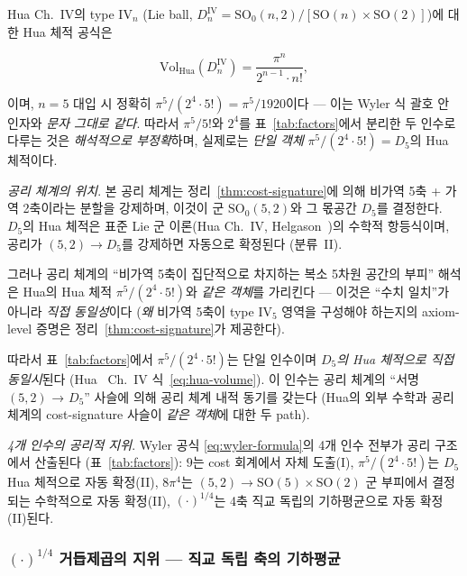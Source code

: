 \documentclass[entropy,article,submit,pdftex,oneauthor]{Definitions/mdpi}
\begin{document}
Hua Ch.~IV의 type IV$_n$ (Lie ball, $D_n^{\text{IV}} = \mathrm{SO}_0(n,2)/[\mathrm{SO}(n)\times\mathrm{SO}(2)]$)에 대한 Hua 체적 공식은
\begin{linenomath}
\begin{equation}
\mathrm{Vol}_{\text{Hua}}(D_n^{\text{IV}}) = \frac{\pi^n}{2^{n-1} \cdot n!},
\label{eq:hua-volume}
\end{equation}
\end{linenomath}
이며, $n=5$ 대입 시 정확히 $\pi^5/(2^4 \cdot 5!) = \pi^5/1920$이다 — 이는 Wyler 식 괄호 안 인자와 \emph{문자 그대로 같다}. 따라서 $\pi^5/5!$와 $2^4$를 표~\ref{tab:factors}에서 분리한 두 인수로 다루는 것은 \emph{해석적으로 부정확}하며, 실제로는 \emph{단일 객체} $\pi^5/(2^4 \cdot 5!) = D_5$의 Hua 체적이다.

\textit{공리 체계의 위치}. 본 공리 체계는 정리~\ref{thm:cost-signature}에 의해 비가역 5축 + 가역 2축이라는 분할을 강제하며, 이것이 군 $\mathrm{SO}_0(5,2)$와 그 몫공간 $D_5$를 결정한다. $D_5$의 Hua 체적은 표준 Lie 군 이론(Hua Ch.~IV, Helgason~\cite{helgason1978})의 수학적 항등식이며, 공리가 $(5,2) \to D_5$를 강제하면 자동으로 확정된다 (분류~II).

그러나 공리 체계의 ``비가역 5축이 집단적으로 차지하는 복소 5차원 공간의 부피'' 해석은 Hua의 Hua 체적 $\pi^5/(2^4 \cdot 5!)$와 \emph{같은 객체}를 가리킨다 — 이것은 ``수치 일치''가 아니라 \emph{직접 동일성}이다 (\emph{왜} 비가역 5축이 type IV$_5$ 영역을 구성해야 하는지의 axiom-level 증명은 정리~\ref{thm:cost-signature}가 제공한다).

따라서 표~\ref{tab:factors}에서 $\pi^5/(2^4 \cdot 5!)$는 단일 인수이며 \emph{$D_5$의 Hua 체적으로 직접 동일시}된다 (Hua~\cite{hua1963} Ch.~IV 식~\eqref{eq:hua-volume}). 이 인수는 공리 체계의 ``서명 $(5,2)$ → $D_5$'' 사슬에 의해 공리 체계 내적 동기를 갖는다 (Hua의 외부 수학과 공리 체계의 cost-signature 사슬이 \emph{같은 객체}에 대한 두 path).

\textit{4개 인수의 공리적 지위}. Wyler 공식 \eqref{eq:wyler-formula}의 4개 인수 전부가 공리 구조에서 산출된다 (표~\ref{tab:factors}): $9$는 cost 회계에서 자체 도출(I), $\pi^5/(2^4 \cdot 5!)$는 $D_5$ Hua 체적으로 자동 확정(II), $8\pi^4$는 $(5,2) \to \mathrm{SO}(5)\times\mathrm{SO}(2)$ 군 부피에서 결정되는 수학적으로 자동 확정(II), $(\cdot)^{1/4}$는 4축 직교 독립의 기하평균으로 자동 확정(II)된다.

\subsubsection{$(\cdot)^{1/4}$ 거듭제곱의 지위 --- 직교 독립 축의 기하평균}
\end{document}
